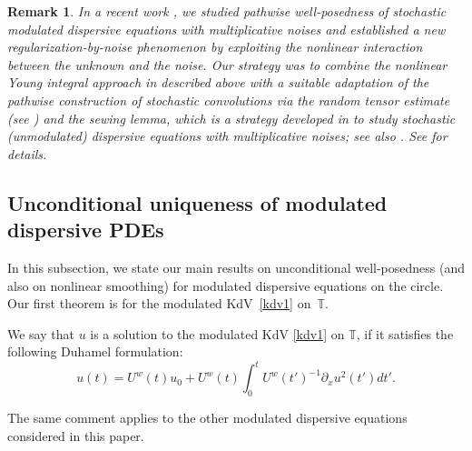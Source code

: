 \documentclass[letterpaper, 11pt,  reqno]{amsart}
\newtheorem{remark}[theorem]{Remark}
\newcommand{\1}{\hspace{0.5mm}\text{I}\hspace{0.5mm}}
\newcommand{\noi}{\noindent}
\newcommand{\T}{\mathbb{T}}
\newcommand{\dx}{\partial_x}
\numberwithin{equation}{section}
\numberwithin{theorem}{section}
\begin{document}
\begin{remark}\rm 
In a recent work \cite{CGLLO2}, we studied
pathwise well-posedness of stochastic modulated dispersive equations
with multiplicative noises
and established a new 
regularization-by-noise phenomenon by exploiting the nonlinear interaction between the unknown and the noise.
Our strategy was 
to combine
the nonlinear Young integral approach in \cite{CGLLO1}
described above
with a suitable adaptation of 
the pathwise construction
of  stochastic convolutions
via 
the random tensor estimate (see \cite{DNY3, OWZ, OW3}) 
and the sewing lemma, 
which is a strategy
developed in \cite{CLO2, COZ}
to study
 stochastic (unmodulated) dispersive equations with multiplicative noises;
see also \cite {OS2}.
See \cite{CGLLO2} for details.









\end{remark}












\subsection{Unconditional uniqueness
of modulated dispersive PDEs}
\label{SUBSEC:UU}



In this subsection, 
we state our main results
on
unconditional well-posedness
(and also on nonlinear smoothing)
for modulated dispersive equations on the circle. 
Our first theorem is for the modulated KdV~\eqref{kdv1} on~$\T$.

We say that $u$
is a solution to the modulated KdV \eqref{kdv1} on $\T$, 
if it satisfies the following Duhamel formulation:
\begin{equation}
u(t) = U^w(t) u_0 +  U^w({t}) \int_0^t  U^w({t'})^{-1}\dx u^2(t')  dt'.
\label{mild1x}
\end{equation}


\noi
The same comment applies
to the other modulated dispersive equations considered in this paper.
\end{document}
